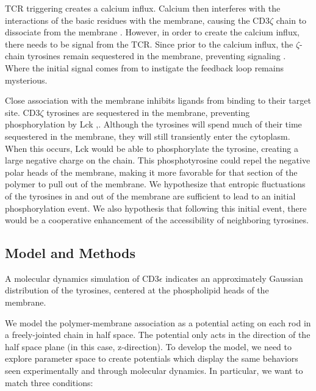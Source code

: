 \documentclass[../../AdvancementSummary.tex]{subfiles}
\begin{document}
TCR triggering creates a calcium influx. Calcium then interferes with the interactions of the basic residues with the membrane, causing the CD3$\zeta$ chain to dissociate from the membrane \cite{Shi2013}. However, in order to create the calcium influx, there needs to be signal from the TCR. 
Since prior to the calcium influx, the $\zeta$-chain tyrosines remain sequestered in the membrane, preventing signaling . Where the initial signal comes from to instigate the feedback loop remains mysterious.

Close association with the membrane inhibits ligands from binding to their target site. CD3$\zeta$ tyrosines are sequestered in the membrane, preventing phosphorylation by Lck \cite{Aivazian2000},\cite{Shi2013}.  Although the tyrosines will spend much of their time sequestered in the membrane, they will still transiently enter the cytoplasm. When this occurs, Lck would be able to phosphorylate the tyrosine, creating a large negative charge on the chain. This phosphotyrosine could repel the negative polar heads of the membrane, making it more favorable for that section of the polymer to pull out of the membrane. We hypothesize that entropic fluctuations of the tyrosines in and out of the membrane are sufficient to lead to an initial phosphorylation event. We also hypothesis that following this initial event, there would be a cooperative enhancement of the accessibility of neighboring tyrosines.


\subsection{Model and Methods}


A molecular dynamics simulation of CD3$\epsilon$ indicates an approximately Gaussian distribution of the tyrosines, centered at the phospholipid heads of the membrane. \cite{Lopez2015}

We model the polymer-membrane association as a potential acting on each rod in a freely-jointed chain in half space. The potential only acts in the direction of the half space plane (in this case, z-direction). To develop the model, we need to explore parameter space to create potentials which display the same behaviors seen experimentally and through molecular dynamics. In particular, we want to match three conditions:
\end{document}
